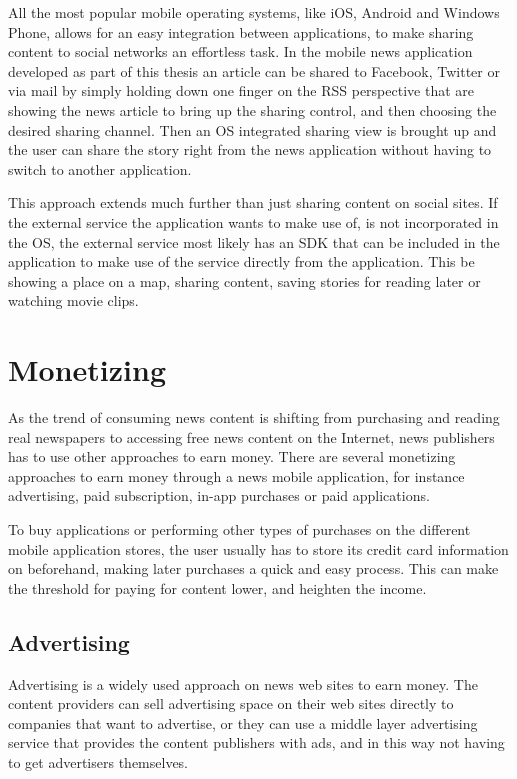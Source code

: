 All the most popular mobile operating systems, like iOS, Android and Windows Phone, allows for an easy integration between applications, to make sharing content to social networks an effortless task. In the mobile news application developed as part of this thesis an article can be shared to Facebook, Twitter or via mail by simply holding down one finger on the RSS perspective that are showing the news article to bring up the sharing control, and then choosing the desired sharing channel. Then an OS integrated sharing view is brought up and the user can share the story right from the news application without having to switch to another application.

This approach extends much further than just sharing content on social sites. If the external service the application wants to make use of, is not incorporated in the OS, the external service most likely has an SDK that can be included in the application to make use of the service directly from the application. This be showing a place on a map, sharing content, saving stories for reading later or watching movie clips.

\section{Monetizing}
As the trend of consuming news content is shifting from purchasing and reading real newspapers to accessing free news content on the Internet, news publishers has to use other approaches to earn money. There are several monetizing approaches to earn money through a news mobile application, for instance advertising, paid subscription, in-app purchases or paid applications.

To buy applications or performing other types of purchases on the different mobile application stores, the user usually has to store its credit card information on beforehand, making later purchases a quick and easy process. This can make the threshold for paying for content lower, and heighten the income.

\subsection{Advertising}
Advertising is a widely used approach on news web sites to earn money. The content providers can sell advertising space on their web sites directly to companies that want to advertise, or they can use a middle layer advertising service that provides the content publishers with ads, and in this way not having to get advertisers themselves. 

